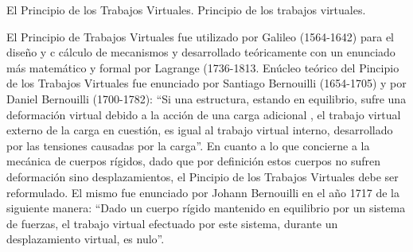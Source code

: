 \begin{myblock}{El Principio de los Trabajos Virtuales.}
Principio de los trabajos virtuales.

El Principio de Trabajos Virtuales fue utilizado por Galileo (1564-1642) para el diseño y c cálculo de mecanismos y desarrollado teóricamente con un enunciado más matemático y formal por Lagrange (1736-1813. 
Enúcleo teórico del Pincipio  de los Trabajos Virtuales fue enunciado por Santiago Bernouilli (1654-1705) y por Daniel Bernouilli (1700-1782): “Si una estructura, estando en equilibrio, sufre una deformación virtual debido a la acción de una carga adicional , el trabajo virtual externo de la carga en cuestión, es igual al trabajo virtual interno, desarrollado por las tensiones causadas por la carga”. 
En cuanto a lo que concierne a la mecánica de cuerpos rígidos, dado que por definición estos cuerpos no sufren deformación sino desplazamientos, el Pincipio  de los Trabajos Virtuales debe ser reformulado. El mismo fue enunciado por Johann Bernouilli en el año 1717 de la siguiente manera: “Dado un cuerpo rígido mantenido en equilibrio por un sistema de fuerzas, el trabajo virtual efectuado por este sistema, durante un desplazamiento virtual, es nulo”. 
\end{myblock}


